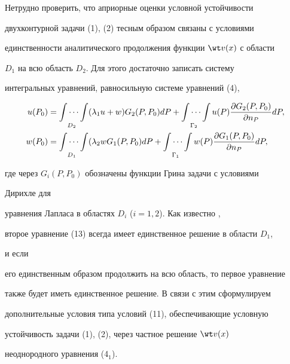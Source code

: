 \begin{note} 


Нетрудно проверить, что априорные оценки условной устойчивости 


двухконтурной задачи (1), (2) тесным образом связаны с условиями 


единственности аналитического продолжения функции $\wt v(x)$ с области 


$D_1$ на всю область $D_2$. Для этого достаточно записать систему 


интегральных уравнений, равносильную системе уравнений (4),


\begin{equation} 


\begin{split} 


u(P_0)&=\idotsint\limits_{D_2}(\lambda_1u+w)G_2(P,P_0)dP+ 


\idotsint\limits_{\Gamma_2}u(P) 


\frac{\partial G_2(P,P_0)}{\partial n_P}dP, \\ 


% 


w(P_0)&=\idotsint\limits_{D_1}(\lambda_2w G_1(P,P_0)dP+ 


\idotsint\limits_{\Gamma_1}w(P) 


\frac{\partial G_1(P,P_0)}{\partial n_P}dP,


\end{split} 


\end{equation} 


где через $G_i(P,P_0)$ обозначены функции Грина задачи с условиями 


Дирихле для 


уравнения Лапласа в областях $D_i$ ($i=1,2$). Как известно \cite{7}, 


второе уравнение (13) всегда имеет единственное решение в области $D_1$, 


и если 


его единственным образом продолжить на всю область, то первое уравнение 


также будет иметь единственное решение. В связи с этим сформулируем 


дополнительные условия типа условий (11), обеспечивающие условную 


устойчивость задачи (1), (2), через частное решение $\wt v(x)$ 


неоднородного уравнения (4${}_1$). 


\end{note} 


